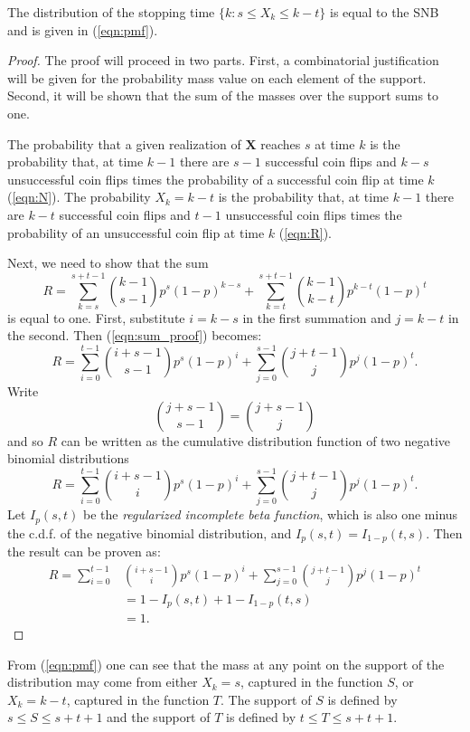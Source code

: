\documentclass[12pt]{article}         %
\begin{document}
\begin{prop}
The distribution of the stopping time $\{k: s \leq X_k \leq k-t \}$ is equal to the SNB and is given in (\ref{eqn:pmf}). 
\end{prop}
\begin{proof}
The proof will proceed in two parts. First, a combinatorial justification will be given for the probability mass value on each element of the support. Second, it will be shown that the sum of the masses over the support sums to one.

The probability that a given realization of $\mathbf{X}$ reaches $s$ at time $k$ is  the probability that, at time $k-1$ there are $s-1$ successful coin flips and $k-s$ unsuccessful coin flips times the probability of a successful coin flip at time $k$ (\ref{eqn:N}). The probability $X_k = k-t$ is the probability that, at time $k-1$ there are $k-t$ successful coin flips and $t-1$ unsuccessful coin flips times the probability of an unsuccessful coin flip at time $k$ (\ref{eqn:R}).

Next, we need to show that the sum
\begin{equation} \label{eqn:sum_proof}
R = \sum_{k=s}^{s+t-1} {k-1 \choose s-1} p^s (1-p)^{k-s} + \sum_{k=t}^{s+t-1} {k-1 \choose k-t} p^{k-t} (1-p)^t
\end{equation}
is equal to one.
First, substitute $i=k-s$ in the first summation and
$j=k-t$ in the second. Then (\ref{eqn:sum_proof}) becomes:
\begin{equation*}
R = \sum_{i=0}^{t-1} {i+s-1 \choose s-1} p^s (1-p)^i +
\sum_{j=0}^{s-1} {j+t-1 \choose j} p^j (1-p)^t.
\end{equation*}
Write   
\begin{equation*}
{j+s-1 \choose s-1} = {j+s-1 \choose j}
\end{equation*}
and so $R$ can be written
as the cumulative distribution function of two 
negative binomial distributions
\begin{equation} \label{eqn:transformed_sum}
R = \sum_{i=0}^{t-1} {i+s-1 \choose i} p^s (1-p)^i +
\sum_{j=0}^{s-1} {j+t-1 \choose j} p^j (1-p)^t.
\end{equation}
Let $I_p(s, t)$ be the {\em regularized incomplete beta function}, which is also one minus the c.d.f. of the negative
binomial distribution, and $I_p(s, t) = I_{1-p}(t, s)$.
Then the result can be proven as:
\begin{align*}
R = \sum_{i=0}^{t-1} &{i+s-1 \choose i} p^s (1-p)^i +
\sum_{j=0}^{s-1}  {j+t-1 \choose j} p^j  (1-p)^t \\
   &= 1-I_p(s, t) + 1 - I_{1-p}(t, s) \\
   &= 1. 
\end{align*}
\end{proof}
From (\ref{eqn:pmf}) one can see that the mass at any point on the support of the distribution may come from either $X_k = s$, captured in the function $S$, or $X_k = k-t$, captured in the function $T$. The support of $S$ is defined by $s \leq S \leq s+t+1$ and the support of $T$ is defined by $t \leq T \leq s+t+1$.
\end{document}

